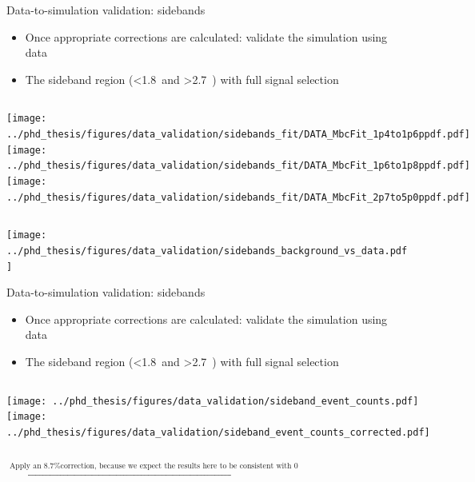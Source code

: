 \documentclass[xcolor=dvipsnames]{beamer}
\begin{document}
\begin{frame}{Data-to-simulation validation: sidebands}
   \scriptsize\centering
   \begin{itemize}
      \item Once appropriate corrections are calculated: validate the simulation using data
      \item The sideband region (\EB<1.8~\gev and \EB>2.7~\gev) with full signal selection
   \end{itemize}

   \begin{columns}
      \centering
      \texttt{[image: ../phd\_thesis/figures/data\_validation/sidebands\_fit/DATA\_MbcFit\_1p4to1p6ppdf.pdf]}
      \centering
      \texttt{[image: ../phd\_thesis/figures/data\_validation/sidebands\_fit/DATA\_MbcFit\_1p6to1p8ppdf.pdf]}
      \centering
      \texttt{[image: ../phd\_thesis/figures/data\_validation/sidebands\_fit/DATA\_MbcFit\_2p7to5p0ppdf.pdf]}
   \end{columns}

   \texttt{[image: ../phd\_thesis/figures/data\_validation/sidebands\_background\_vs\_data.pdf]}


\end{frame}
\begin{frame}{Data-to-simulation validation: sidebands}
   \scriptsize\centering
   \begin{itemize}
      \item Once appropriate corrections are calculated: validate the simulation using data
      \item The sideband region (\EB<1.8~\gev and \EB>2.7~\gev) with full signal selection
   \end{itemize}

   \begin{columns}
      \centering
      \texttt{[image: ../phd\_thesis/figures/data\_validation/sideband\_event\_counts.pdf]}
    \centering
     \texttt{[image: ../phd\_thesis/figures/data\_validation/sideband\_event\_counts\_corrected.pdf]}
   \end{columns}

   $\xrightarrow{\text{Apply an 8.7\% correction, because we expect the results here to be consistent with 0}}$

\end{frame}
\end{document}
